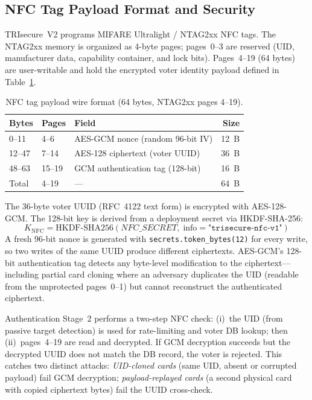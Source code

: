 \documentclass[pdflatex,sn-vancouver-num]{sn-jnl}%
\theoremstyle{thmstyleone}%
\theoremstyle{thmstyletwo}%
\theoremstyle{thmstylethree}%
\begin{document}
\subsection{NFC Tag Payload Format and Security}

TRIsecure~V2 programs MIFARE Ultralight / NTAG2xx NFC tags. The NTAG2xx
memory is organized as 4-byte pages; pages~0--3 are reserved (UID,
manufacturer data, capability container, and lock bits). Pages~4--19 (64
bytes) are user-writable and hold the encrypted voter identity payload
defined in Table~\ref{tab:nfc_payload}.

\begin{table}[t]
\caption{NFC tag payload wire format (64 bytes, NTAG2xx pages 4--19).}
\label{tab:nfc_payload}%
\begin{tabular}{|l|l|l|r|}
  \hline
  Bytes & Pages & Field & Size \\
  \hline
  0--11   & 4--6    & AES-GCM nonce (random 96-bit IV) & 12~B \\
  12--47  & 7--14   & AES-128 ciphertext (voter UUID) & 36~B \\
  48--63  & 15--19  & GCM authentication tag (128-bit) & 16~B \\
  \hline
  Total   & 4--19   & --- & 64~B \\
  \hline
\end{tabular}
\end{table}

The 36-byte voter UUID (RFC~4122 text form) is encrypted with AES-128-GCM.
The 128-bit key is derived from a deployment secret via HKDF-SHA-256:
\begin{equation}
  K_{\mathrm{NFC}} = \mathrm{HKDF\text{-}SHA256}(\mathit{NFC\_SECRET},\;
    \text{info}{=}\texttt{"trisecure-nfc-v1"})
\end{equation}
A fresh 96-bit nonce is generated with \texttt{secrets.token\_bytes(12)} for
every write, so two writes of the same UUID produce different ciphertexts.
AES-GCM's 128-bit authentication tag detects any byte-level modification to
the ciphertext---including partial card cloning where an adversary duplicates
the UID (readable from the unprotected pages~0--1) but cannot reconstruct the
authenticated ciphertext.

Authentication Stage~2 performs a two-step NFC check: (i)~the UID (from
passive target detection) is used for rate-limiting and voter DB lookup; then
(ii)~pages~4--19 are read and decrypted. If GCM decryption succeeds but the
decrypted UUID does not match the DB record, the voter is rejected. This
catches two distinct attacks: \emph{UID-cloned cards} (same UID, absent or
corrupted payload) fail GCM decryption; \emph{payload-replayed cards} (a
second physical card with copied ciphertext bytes) fail the UUID cross-check.
\end{document}
